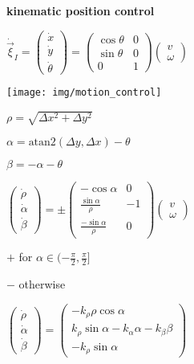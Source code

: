 \documentclass[fontsize=6pt]{scrartcl}
\begin{document}
\begin{multicols*}{4}
\textbf{kinematic position control}

\begin{minipage}{0.5\columnwidth}
	$\dot{\vec{\xi}}_I = 
	\begin{pmatrix}
	\dot x\\
	\dot y\\
	\dot \theta
	\end{pmatrix}
	=
	\left(
	\begin{smallmatrix}
	\cos\theta & 0\\
	\sin\theta & 0\\
	0 & 1
	\end{smallmatrix}
	\right)
	\begin{pmatrix}
	v\\
	\omega
	\end{pmatrix}
	$
	
\texttt{[image: img/motion\_control]}
\end{minipage}
\begin{minipage}{0.5\columnwidth}
$\rho = \sqrt{\Delta x^2 + \Delta y^2}$

$\alpha= \text{atan2}(\Delta y, \Delta x) - \theta$

$\beta = -\alpha - \theta$

$
\begin{pmatrix}
\dot{\rho}\\
\dot{\alpha}\\
\dot \beta
\end{pmatrix}
= 
\pm
\left(
\begin{smallmatrix}
-\cos\alpha & 0\\
\frac{\sin \alpha}{\rho} & -1\\
\frac{-\sin \alpha}{\rho} & 0
\end{smallmatrix}
\right)
\begin{pmatrix}
v\\
\omega
\end{pmatrix}
$

$+$ for $\alpha \in (- \frac{\pi}{2},\frac{\pi}{2}]$

$-$ otherwise

$
\begin{pmatrix}
	\dot{\rho}\\
	\dot{\alpha}\\
	\dot \beta
\end{pmatrix}
=
\left(
\begin{smallmatrix}
-k_\rho \rho \cos\alpha\\
k_\rho \sin \alpha - k_\alpha \alpha - k_\beta \beta\\
-k_\rho \sin \alpha
\end{smallmatrix}
\right)
$


\end{minipage}
\end{multicols*}
\end{document}
